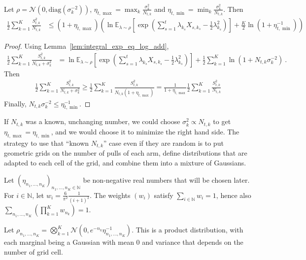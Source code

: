 \begin{corollary}\label{cor:sum_le_eta_mul}
Let $\rho = \mathcal N(0, \mathrm{diag}(\sigma_k^{-2}))$, $\eta_{t,\max} = \max_k \frac{\sigma_k^2}{N_{t,k}}$ and $\eta_{t,\min} = \min_k \frac{\sigma_k^2}{N_{t,k}}$. Then
\begin{align*}
\frac{1}{2} \sum_{k=1}^K \frac{S_{t,k}^2}{N_{t,k}}
&\le (1 + \eta_{t,\max}) \left(\ln \mathbb{E}_{\lambda \sim \rho}\left[\exp\left(\sum_{s=1}^t \lambda_{k_s}X_{s,k_s} - \frac{1}{2}\lambda_{k_s}^2\right)\right]
  + \frac{K}{2}\ln(1 + \eta_{t,\min}^{-1})\right)
\end{align*}

\end{corollary}

\begin{proof}
Using Lemma~\ref{lem:integral_exp_eq_log_add},
\begin{align*}
\frac{1}{2} \sum_{k=1}^K \frac{S_{t,k}^2}{N_{t,k} + \sigma_k^2}
&= \ln \mathbb{E}_{\lambda \sim \rho}\left[\exp\left(\sum_{s=1}^t \lambda_{k_s}X_{s,k_s} - \frac{1}{2}\lambda_{k_s}^2\right)\right]
  + \frac{1}{2} \sum_{k=1}^K \ln(1 + N_{t,k}\sigma_k^{-2})
\: .
\end{align*}
Then
\begin{align*}
\frac{1}{2} \sum_{k=1}^K \frac{S_{t,k}^2}{N_{t,k} + \sigma_k^2}
\ge \frac{1}{2} \sum_{k=1}^K \frac{S_{t,k}^2}{N_{t,k}(1 + \eta_{t,\max})}
= \frac{1}{1 + \eta_{t,\max}}\frac{1}{2} \sum_{k=1}^K \frac{S_{t,k}^2}{N_{t,k}}
\end{align*}
Finally, $N_{t,k} \sigma_k^{-2} \le \eta_{t,\min}^{-1}$.
\end{proof}

If $N_{t,k}$ was a known, unchanging number, we could choose $\sigma_k^2 \propto N_{t,k}$ to get $\eta_{t,\max} = \eta_{t, \min}$, and we would choose it to minimize the right hand side.
The strategy to use that ``known $N_{t,k}$'' case even if they are random is to put geometric grids on the number of pulls of each arm, define distributions that are adapted to each cell of the grid, and combine them into a mixture of Gaussians.

Let $(\eta_{n_1, \ldots, n_K})_{n_1, \ldots, n_K \in \mathbb{N}}$ be non-negative real numbers that will be chosen later.
For $i \in \mathbb{N}$, let $w_i = \frac{6}{\pi^2}\frac{1}{(i+1)^2}$. The weights $(w_i)$ satisfy $\sum_{i \in \mathbb{N}} w_i = 1$, hence also $\sum_{n_1, \ldots, n_K} (\prod_{k=1}^K w_{n_k}) = 1$.

Let $\rho_{n_1, \ldots, n_K} = \bigotimes_{k=1}^K \mathcal N(0, e^{- n_k} \eta_{n_1, \ldots, n_K}^{-1})$. This is a product distribution, with each marginal being a Gaussian with mean 0 and variance that depends on the number of grid cell.

